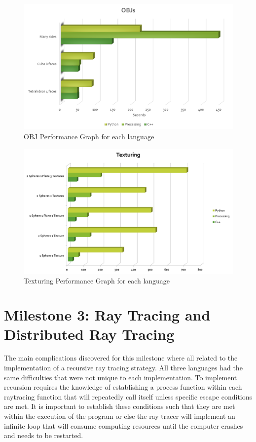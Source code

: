 \begin{figure}[ht]
\centering
\includegraphics[width=\textwidth]{figures/graphs/obj-graph.png}
\caption{OBJ Performance Graph for each language}
\label{fig:objgraph}
\end{figure}

\begin{figure}[ht]
\centering
\includegraphics[width=\textwidth]{figures/graphs/texturing.png}
\caption{Texturing Performance Graph for each language}
\label{fig:texgraph}
\end{figure}

\section{Milestone 3: Ray Tracing and Distributed Ray Tracing}
The main complications discovered for this milestone where all related to the implementation of a recursive ray tracing strategy.  All three languages had the same difficulties that were not unique to each implementation.  To implement recursion requires the knowledge of establishing a process function within each raytracing function that will repeatedly call itself unless specific escape conditions are met.  It is important to establish these conditions such that they are met within the execution of the program or else the ray tracer will implement an infinite loop that will consume computing resources until the computer crashes and needs to be restarted.

